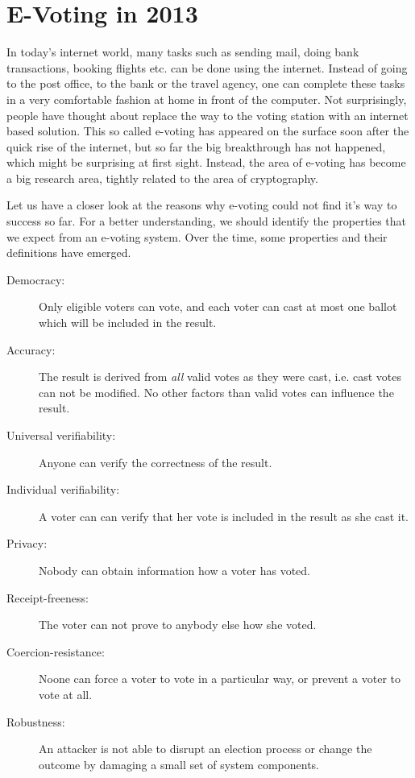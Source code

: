 \documentclass[numbers=noenddot, abstract=on, a4paper, headsepline,
footsepline, oneside, draft=off]{scrreprt}
\begin{document}
\section{E-Voting in 2013}
\label{sec:evoting}
In today's internet world, many tasks such as sending mail, doing bank
transactions, booking flights etc. can be done using the internet. Instead of
going to the post office, to the bank or the travel agency, one can complete
these tasks in a very comfortable fashion at home in front of the computer. Not
surprisingly, people have thought about replace the way to the voting station
with an internet based solution. This so called e-voting has appeared on the
surface soon after the quick rise of the internet, but so far the big
breakthrough has not happened, which might be surprising at first sight.
Instead, the area of e-voting has become a big research area, tightly related to
the area of cryptography.

Let us have a closer look at the reasons why e-voting
could not find it's way to success so far. For a better understanding, we should
identify the properties that we expect from an e-voting system. Over the time,
some properties and their definitions have emerged.

\begin{description}
  \item[Democracy:] Only eligible voters can vote, and each voter can
  cast at most one ballot which will be included in the result.
  \item[Accuracy:] The result is derived from \emph{all} valid
  votes as they were cast, i.e. cast votes can not be modified. No other factors
  than valid votes can influence the result.
  \item[Universal verifiability:] Anyone can verify the correctness of
  the result.
  \item[Individual verifiability:] A voter can can verify that her vote
  is included in the result as she cast it.
  \item[Privacy:] Nobody can obtain information how a voter has
  voted.
  \item[Receipt-freeness:] The voter can not prove to anybody else how
  she voted.
  \item[Coercion-resistance:] Noone can force a voter to vote in a
  particular way, or prevent a voter to vote at all.
  \item[Robustness:] An attacker is not able to disrupt an election
  process or change the outcome by damaging a small set of system components. 
\end{description}
\end{document}
